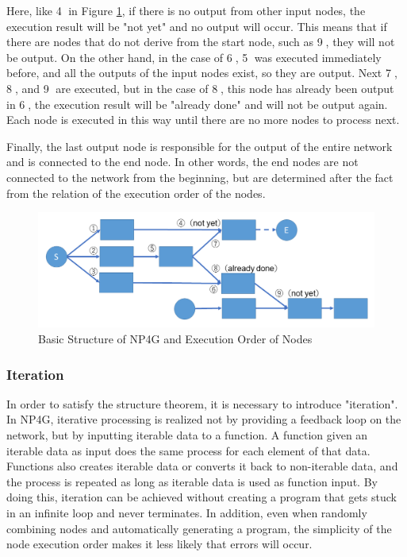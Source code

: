 \documentclass{article}
\begin{document}
Here, like \textcircled{\scriptsize 4} in Figure \ref{fig:sequence}, if there is no output from other input nodes, the execution result will be "not yet" and no output will occur.
This means that if there are nodes that do not derive from the start node, such as \textcircled{\scriptsize 9}, they will not be output.
On the other hand, in the case of \textcircled{\scriptsize 6}, \textcircled{\scriptsize 5} was executed immediately before, and all the outputs of the input nodes exist, so they are output.
Next \textcircled{\scriptsize 7}, \textcircled{\scriptsize 8}, and  \textcircled{\scriptsize 9} are executed, but in the case of \textcircled{\scriptsize 8}, this node has already been 
 output in \textcircled{\scriptsize 6}, the execution result will be "already done" and will not be output again.
Each node is executed in this way until there are no more nodes to process next.

Finally, the last output node is responsible for the output of the entire network and is connected to the end node.
In other words, the end nodes are not connected to the network from the beginning, but are determined after the fact from the relation of the execution order of the nodes.

\begin{figure}[t]
\begin{center}
\includegraphics[width=130mm]{sequence.png}
\end{center}
\caption{Basic Structure of NP4G and Execution Order of Nodes}
\label{fig:sequence}
\end{figure}

\subsubsection {Iteration}
In order to satisfy the structure theorem, it is necessary to introduce "iteration".
In NP4G, iterative processing is realized not by providing a feedback loop on the network, but by inputting iterable data to a function.
A function given an iterable data as input does the same process for each element of that data.
Functions also creates iterable data or converts it back to non-iterable data, and the process is repeated as long as iterable data is used as function input.
By doing this, iteration can be achieved without creating a program that gets stuck in an infinite loop and never terminates.
In addition, even when randomly combining nodes and automatically generating a program, the simplicity of the node execution order makes it less likely that errors will occur.
\end{document}
